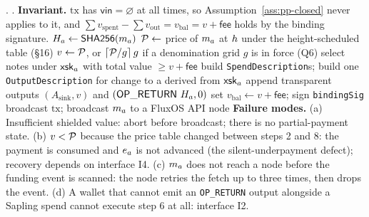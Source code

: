 \begin{palgorithm}[H]
\caption{$\mathsf{Fund}_A(\principal, \app)$ --- payer side. \planned.}
\label{alg:pp-fund}
\DontPrintSemicolon
{}.
.
\medskip\noindent \textbf{Invariant.} $\mathrm{tx}$ has $\mathsf{vin} = \varnothing$ at all times, so Assumption~\ref{ass:pp-closed} never applies to it, and $\sum v_{\mathrm{spent}} - \sum v_{\mathrm{out}} = v_{\mathrm{bal}} = v + \mathsf{fee}$ holds by the binding signature.\medskip
$H_{a} \gets \mathsf{SHA256}(m_{a})$\;
$\mathcal{P} \gets$ price of $m_{a}$ at $h$ under the height-scheduled table (\S16)\;
$v \gets \mathcal{P}$, or $\lceil \mathcal{P}/g\rceil\, g$ if a denomination grid $g$ is in force (Q6)\;
select notes under $\mathsf{xsk}_{a}$ with total value $\ge v + \mathsf{fee}$\;
build \texttt{Spend\allowbreak{}Description}s; build one \texttt{Output\allowbreak{}Description} for change to a \zaddr{} derived from $\mathsf{xsk}_{a}$ \;
append transparent outputs $(A_{\mathrm{sink}}, v)$ and $(\mathsf{OP\_RETURN}\ H_{a}, 0)$\;
set $v_{\mathrm{bal}} \gets v + \mathsf{fee}$; sign \texttt{bindingSig}\;
broadcast $\mathrm{tx}$; broadcast $m_{a}$ to a FluxOS API node\;
\medskip\noindent \textbf{Failure modes.} (a) Insufficient shielded value: abort before broadcast; there is no partial-payment state. (b) $v < \mathcal{P}$ because the price table changed between steps 2 and 8: the payment is consumed and $e_{a}$ is not advanced (the silent-underpayment defect); recovery depends on interface I4. (c) $m_{a}$ does not reach a node before the funding event is scanned: the node retries the fetch up to three times, then drops the event. (d) A wallet that cannot emit an \texttt{OP\_RETURN} output alongside a Sapling spend cannot execute step 6 at all: interface I2.\medskip
\end{palgorithm}

